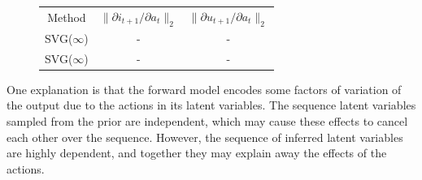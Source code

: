 \documentclass{article} %
\begin{document}
\begin{figure}[t!]
    \centering
  \begin{tabular}{|ccc|}
    \hline
    Method & $\| \partial i_{t+1} / \partial a_t \|_2$ & $\| \partial u_{t+1} / \partial {a_t} \|_2$\\
    \hhline{|===|}
    SVG($\infty$) & - & - \\
    SVG($\infty$) & - & - \\
    \hline
  \end{tabular}
\end{figure}




One explanation is that the forward model encodes some factors of variation of the output due to the actions in its latent variables.
The sequence latent variables sampled from the prior are independent, which may cause these effects to cancel each other over the sequence. However, the sequence of inferred latent variables are highly dependent, and together they may explain away the effects of the actions.


\end{document}
